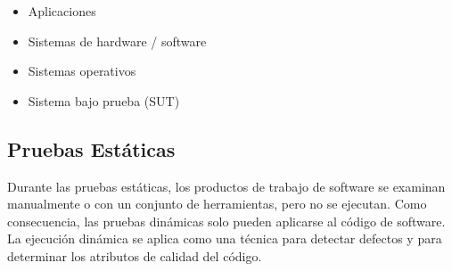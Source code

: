 \begin{itemize}
	\item Aplicaciones
	\item Sistemas de hardware / software
	\item Sistemas operativos
	\item Sistema bajo prueba (SUT)
\end{itemize}

\subsection{Pruebas Estáticas}

Durante las pruebas estáticas, los productos de trabajo de software se examinan manualmente o con un conjunto de herramientas, pero no se ejecutan. Como consecuencia, las pruebas dinámicas solo pueden aplicarse al código de software. La ejecución dinámica se aplica como una técnica para detectar defectos y para determinar los atributos de calidad del código. 
